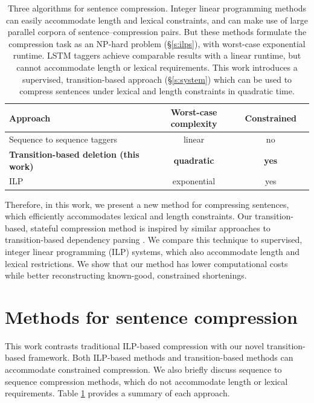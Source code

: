 \documentclass[11pt,a4paper]{article}
\begin{document}
\begin{table}[htb!]
\begin{tabular}{lccc}
\textbf{Approach} & \textbf{Worst-case complexity} & \textbf{Constrained}  \\ \hline
Sequence to sequence taggers \cite{filippova2015sentence}   & linear              & no         \\   
\textbf{Transition-based deletion (this work)}  & \textbf{quadratic}     &      \textbf{yes}   \\
ILP    \cite{filippova2013overcoming,Wang2017CanSH}       &   exponential    & yes      \\
\end{tabular}
\caption{Three algorithms for sentence compression. Integer linear programming methods \cite{clarke2008global,filippova2013overcoming,Wang2017CanSH} can easily accommodate length and lexical constraints, and can make use of large parallel corpora of sentence--compression pairs. But these methods formulate the compression task as an NP-hard problem (\S\ref{s:ilps}), with worst-case exponential runtime. LSTM taggers \cite{filippova2015sentence} achieve comparable results with a linear runtime, but cannot accommodate length or lexical requirements. This work introduces a supervised, transition-based approach (\S\ref{s:system}) which can be used to compress sentences under lexical and length constraints in quadratic time.} 
\label{t:algos}
\end{table}


Therefore, in this work, we present a new method for compressing sentences, which efficiently accommodates lexical and length constraints. Our transition-based, stateful compression method is inspired by similar approaches to transition-based dependency parsing \cite{nivre2003,D14-1082}. We compare this technique to supervised, integer linear programming (ILP) systems, which also accommodate length and lexical restrictions. We show that our method has lower computational costs while better reconstructing known-good, constrained shortenings. 

\section{Methods for sentence compression}

This work contrasts traditional ILP-based compression with our novel transition-based framework. Both ILP-based methods and transition-based methods can accommodate constrained compression. We also briefly discuss sequence to sequence compression methods, which do not accommodate length or lexical requirements. Table \ref{t:algos} provides a summary of each approach.
\end{document}
